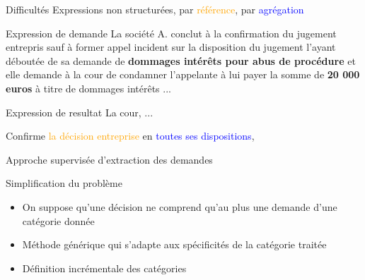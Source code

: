 \documentclass[newPxFont,pagenumber]{beamer}
\begin{document}
\begin{frame}{Difficultés}
Expressions non structurées, par  \textcolor{orange}{référence}, par \textcolor{blue}{agrégation}

\begin{exampleblock}{Expression de demande}
La société A. conclut à la confirmation du jugement entrepris sauf à
former appel incident sur la disposition du jugement l'ayant déboutée de sa
demande de \textbf{dommages intérêts pour abus de procédure} et elle demande à la cour de
condamner l'appelante à lui payer la somme de \textbf{20 000 euros} à titre de dommages
intérêts ...



\end{exampleblock}

\begin{exampleblock}{Expression de resultat}
La cour, ... 

Confirme \textcolor{orange}{la décision entreprise} en \textcolor{blue}{toutes ses dispositions},
\end{exampleblock}
\end{frame}

\begin{frame}{Approche supervisée d'extraction des demandes}
\begin{block}{Simplification du problème}
\begin{itemize}
\item On suppose qu'une décision ne comprend qu'au plus une demande d'une catégorie donnée
\item Méthode générique qui s'adapte aux spécificités de la catégorie traitée
\item Définition incrémentale des catégories
\end{itemize}
\end{block}
\end{frame}

\end{document}

